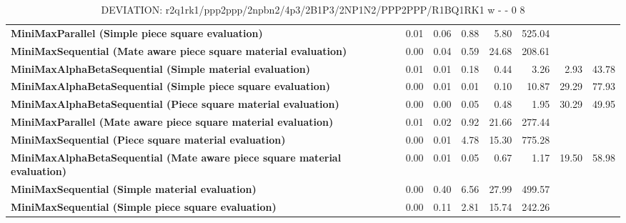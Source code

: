 \begin{table}[H]
{\begin{tabular}{|p{8cm}|*{7}{r|}}
\rowcolor[HTML]{FFFFFF}
\textbf{MiniMaxParallel (Simple piece square evaluation)}               & 0.01 & 0.06 & 0.88 & 5.80 & 525.04 &  &  \\

\rowcolor[HTML]{EFEFEF}
\textbf{MiniMaxSequential (Mate aware piece square material evaluation)}               & 0.00 & 0.04 & 0.59 & 24.68 & 208.61 &  &  \\

\rowcolor[HTML]{FFFFFF}
\textbf{MiniMaxAlphaBetaSequential (Simple material evaluation)}               & 0.01 & 0.01 & 0.18 & 0.44 & 3.26 & 2.93 & 43.78 \\

\rowcolor[HTML]{EFEFEF}
\textbf{MiniMaxAlphaBetaSequential (Simple piece square evaluation)}               & 0.00 & 0.01 & 0.01 & 0.10 & 10.87 & 29.29 & 77.93 \\

\rowcolor[HTML]{FFFFFF}
\textbf{MiniMaxAlphaBetaSequential (Piece square material evaluation)}               & 0.00 & 0.00 & 0.05 & 0.48 & 1.95 & 30.29 & 49.95 \\

\rowcolor[HTML]{EFEFEF}
\textbf{MiniMaxParallel (Mate aware piece square material evaluation)}               & 0.01 & 0.02 & 0.92 & 21.66 & 277.44 &  &  \\

\rowcolor[HTML]{FFFFFF}
\textbf{MiniMaxSequential (Piece square material evaluation)}               & 0.00 & 0.01 & 4.78 & 15.30 & 775.28 &  &  \\

\rowcolor[HTML]{EFEFEF}
\textbf{MiniMaxAlphaBetaSequential (Mate aware piece square material evaluation)}               & 0.00 & 0.01 & 0.05 & 0.67 & 1.17 & 19.50 & 58.98 \\

\rowcolor[HTML]{FFFFFF}
\textbf{MiniMaxSequential (Simple material evaluation)}               & 0.00 & 0.40 & 6.56 & 27.99 & 499.57 &  &  \\

\rowcolor[HTML]{EFEFEF}
\textbf{MiniMaxSequential (Simple piece square evaluation)}               & 0.00 & 0.11 & 2.81 & 15.74 & 242.26 &  &  \\

            \hline
        \end{tabular}%
    }
    \caption{DEVIATION: r2q1rk1/ppp2ppp/2npbn2/4p3/2B1P3/2NP1N2/PPP2PPP/R1BQ1RK1 w - - 0 8}
    \label{tab:midgame-tactical-cluster-deviation}
\end{table}
